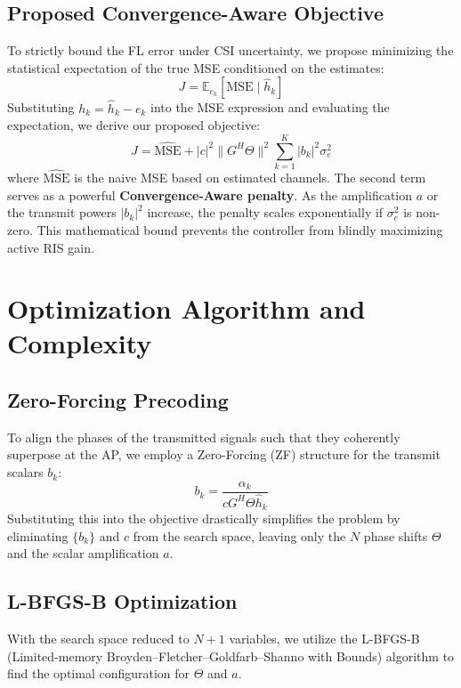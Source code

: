 \documentclass[lettersize,journal]{IEEEtran}
\begin{document}
\subsection{Proposed Convergence-Aware Objective}
To strictly bound the FL error under CSI uncertainty, we propose minimizing the statistical expectation of the true MSE conditioned on the estimates:
\begin{equation}
J = \mathbb{E}_{e_k}[\text{MSE} \mid \hat{h}_k]
\end{equation}
Substituting $h_k = \hat{h}_k - e_k$ into the MSE expression and evaluating the expectation, we derive our proposed objective:
\begin{equation}
J = \widehat{\text{MSE}} + |c|^2 \|G^H \Theta\|^2 \sum_{k=1}^K |b_k|^2 \sigma_e^2
\end{equation}
where $\widehat{\text{MSE}}$ is the naive MSE based on estimated channels. The second term serves as a powerful \textbf{Convergence-Aware penalty}. As the amplification $a$ or the transmit powers $|b_k|^2$ increase, the penalty scales exponentially if $\sigma_e^2$ is non-zero. This mathematical bound prevents the controller from blindly maximizing active RIS gain.

\section{Optimization Algorithm and Complexity}

\subsection{Zero-Forcing Precoding}
To align the phases of the transmitted signals such that they coherently superpose at the AP, we employ a Zero-Forcing (ZF) structure for the transmit scalars $b_k$:
\begin{equation}
b_k = \frac{\alpha_k}{c G^H \Theta \hat{h}_k}
\end{equation}
Substituting this into the objective drastically simplifies the problem by eliminating $\{b_k\}$ and $c$ from the search space, leaving only the $N$ phase shifts $\Theta$ and the scalar amplification $a$.

\subsection{L-BFGS-B Optimization}
With the search space reduced to $N+1$ variables, we utilize the L-BFGS-B (Limited-memory Broyden–Fletcher–Goldfarb–Shanno with Bounds) algorithm to find the optimal configuration for $\Theta$ and $a$.
\end{document}
